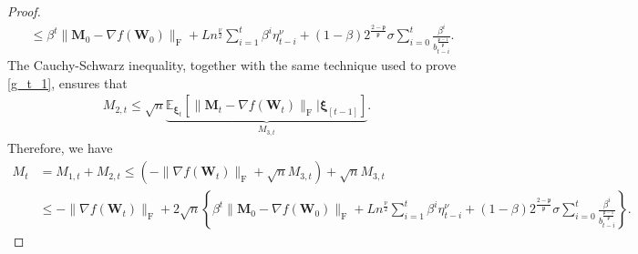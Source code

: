 \documentclass[twoside,11pt]{article}
\begin{document}
\begin{proof}
\begin{align*}
&\leq
\beta^t \| \bm{M}_{0} - \nabla f(\bm{W}_{0}) \|_{\mathrm{F}}
+ L n^{\frac{\nu}{2}} \sum_{i=1}^t \beta^i \eta_{t-i}^\nu 
+ (1 - \beta) 2^{\frac{2 - \mathfrak{p}}{\mathfrak{p}}} \sigma
\sum_{i=0}^t 
\frac{\beta^i}{b_{t-i}^{\frac{\mathfrak{p} -1}{\mathfrak{p}}}}.
\end{align*}
The Cauchy-Schwarz inequality, together with the same technique used to prove \eqref{g_t_1}, ensures that 
\begin{align}\label{m_t_2} 
M_{2,t} \leq \sqrt{n} 
\underbrace{\mathbb{E}_{\bm{\xi}_t} \left[ \| \bm{M}_t - \nabla f(\bm{W}_t) \|_{\mathrm{F}} | \bm{\xi}_{[t-1]} \right]}_{M_{3,t}}.
\end{align}
Therefore, we have 
\begin{align*}
M_t 
&= M_{1,t} + M_{2,t}
\leq 
\left(- \| \nabla f (\bm{W}_t) \|_{\mathrm{F}}
+ \sqrt{n} M_{3,t} \right) 
+ \sqrt{n} M_{3,t}\\
&\leq 
- \| \nabla f (\bm{W}_t) \|_{\mathrm{F}}
+ 2 \sqrt{n}
\left\{  
\beta^t \| \bm{M}_{0} - \nabla f(\bm{W}_{0}) \|_{\mathrm{F}}
+ L n^{\frac{\nu}{2}} \sum_{i=1}^t \beta^i \eta_{t-i}^\nu 
+ (1 - \beta) 2^{\frac{2 - \mathfrak{p}}{\mathfrak{p}}} \sigma
\sum_{i=0}^t 
\frac{\beta^i}{b_{t-i}^{\frac{\mathfrak{p} -1}{\mathfrak{p}}}}
\right\}.
\end{align*}
 


\end{proof}
\end{document}

